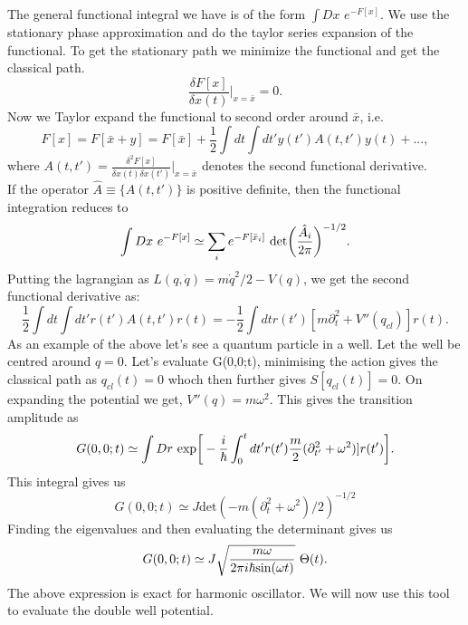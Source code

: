 \documentclass[a4paper, 12pt]{article}
\begin{document}
The general functional integral we have is of the form $\int Dx $ $e^{-F[x]}$. We use the stationary phase approximation and do the taylor series expansion of the functional. To get the stationary path we minimize the functional and get the classical path.
\begin{equation}
\frac{\delta F[x]}{\delta x(t)} \Bigg|_{x=\bar{x}} = 0.
\end{equation}
Now we Taylor expand the functional to second order around $\bar{x}$, i.e.
\begin{equation}
F[x] = F[\bar{x}+y] = F[\bar{x}] + \frac{1}{2}\int dt \int dt' y(t')A(t,t')y(t) + ... ,
\end{equation}
where $A(t,t') = \frac{\delta^2 F[x]}{\delta x(t) \delta x(t')} \bigg|_{x=\bar{x}}$ denotes the second functional derivative.\\
If the operator $\hat{A} \equiv \{A(t,t')\}$ is positive definite, then the functional integration reduces to
\begin{equation}
\int Dx \*\ e^{-F[x]} \simeq \sum_i e^{-F[\bar{x}_i]} \*\ \textrm{det}\bigg(\frac{\hat{A}_i}{2\pi}\bigg)^{-1/2}.
\end{equation}
Putting the lagrangian as $L(q,\dot{q}) = m\dot{q}^2/2 - V(q)$, we get the second functional derivative as:
\begin{equation}
 \frac{1}{2}\int dt \int dt' r(t')A(t,t')r(t) =  -\frac{1}{2}\int dt  r(t')[m\partial^2_t + V''(q_{cl})]r(t).
\end{equation}
As an example of the above let's see a quantum particle in a well. Let the well be centred around $q=0$. Let's evaluate G(0,0;t), minimising the action gives the classical path as $q_{cl}(t)=0$ whoch then further gives $S[q_{cl}(t)]=0$. On expanding the potential we get, $V''(q)= m\omega^2$. This gives the transition amplitude as
\begin{equation}
G(0,0;t) \simeq \int Dr \*\ \textrm{exp} \bigg[-\frac{i}{\hbar}\int_0^t dt'  r(t')\frac{m}{2}(\partial^2_{t'} + \omega^2)]r(t')\bigg].
\end{equation}
This integral gives us
\begin{equation} %
G(0,0;t) \simeq J \textrm{det}(-m(\partial^2_{t} + \omega^2)/2)^{-1/2}
\end{equation}
Finding the eigenvalues and then evaluating the determinant gives us
\begin{equation} %
G(0,0;t) \simeq J \sqrt{\frac{m\omega}{2\pi i \hbar \textrm{sin}(\omega t)}} \*\ \Theta(t).
\end{equation}
The above expression is exact for harmonic oscillator. We will now use this tool to evaluate the double well potential.
\end{document}

